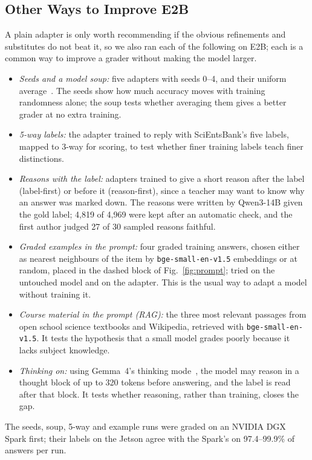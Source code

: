 \documentclass[journal]{IEEEtran}
\begin{document}
\subsection{Other Ways to Improve E2B}
\label{sec:alternatives}
A plain adapter is only worth recommending if the obvious refinements and substitutes do not beat it, so we also ran each of the following on E2B; each is a common way to improve a grader without making the model larger.
\begin{itemize}
\item \textit{Seeds and a model soup:} five adapters with seeds 0--4, and their uniform average~\cite{wortsman2022soups}. The seeds show how much accuracy moves with training randomness alone; the soup tests whether averaging them gives a better grader at no extra training.
\item \textit{5-way labels:} the adapter trained to reply with SciEntsBank's five labels, mapped to 3-way for scoring, to test whether finer training labels teach finer distinctions.
\item \textit{Reasons with the label:} adapters trained to give a short reason after the label (label-first) or before it (reason-first), since a teacher may want to know why an answer was marked down. The reasons were written by Qwen3-14B given the gold label; 4{,}819 of 4{,}969 were kept after an automatic check, and the first author judged 27 of 30 sampled reasons faithful.
\item \textit{Graded examples in the prompt:} four graded training answers, chosen either as nearest neighbours of the item by \texttt{bge-small-en-v1.5} embeddings or at random, placed in the dashed block of Fig.~\ref{fig:prompt}; tried on the untouched model and on the adapter. This is the usual way to adapt a model without training it.
\item \textit{Course material in the prompt (RAG):} the three most relevant passages from open school science textbooks and Wikipedia, retrieved with \texttt{bge-small-en-v1.5}. It tests the hypothesis that a small model grades poorly because it lacks subject knowledge.
\item \textit{Thinking on:} using Gemma~4's thinking mode~\cite{gemma2026gemma4}, the model may reason in a thought block of up to 320 tokens before answering, and the label is read after that block. It tests whether reasoning, rather than training, closes the gap.
\end{itemize}
The seeds, soup, 5-way and example runs were graded on an NVIDIA DGX Spark first; their labels on the Jetson agree with the Spark's on 97.4--99.9\% of answers per run.
\end{document}

